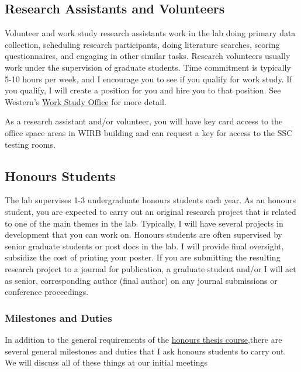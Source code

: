 \documentclass{article}
\begin{document}

\subsection {Research Assistants and Volunteers}
Volunteer and work study research assistants work in the lab doing primary data collection, scheduling research participants, doing literature searches, scoring questionnaires, and engaging in other similar tasks. Research volunteers usually work under the supervision of graduate students. Time commitment is typically 5-10 hours per week, and I encourage you to see if you qualify for work study. If you qualify, I will create a position for you and hire you to that position. See Western's \href{https://workstudy.uwo.ca/}{Work Study Office} for more detail. 

As a research assistant and/or volunteer, you will have key card access to the office space areas in WIRB building and can request a key for access to the SSC testing rooms.
 
\subsection {Honours Students}
The lab supervises 1-3 undergraduate honours students each year. As an honours student, you are expected to carry out an original research project that is related to one of the main themes in the lab. Typically, I will have several projects in development that you can work on. Honours students are often supervised by senior graduate students or post docs in the lab. I will provide final oversight, subsidize the cost of printing your poster. If you are submitting the resulting research project to a journal for publication, a graduate student and/or I will act as senior, corresponding author (final author) on any journal submissions or conference proceedings.

\subsubsection{Milestones and Duties}
In addition to the general requirements of the \href{http://psychology.uwo.ca/undergraduate/honors_thesis/index.html} {honours thesis course},there are several general milestones and duties that I ask honours students to carry out. We will discuss all of these things at our initial meetings 
\end{document}
